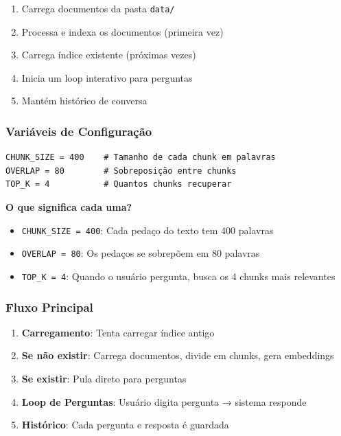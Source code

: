 \documentclass[12pt,a4paper]{article}
\begin{document}
\begin{enumerate}
    \item Carrega documentos da pasta \texttt{data/}
    \item Processa e indexa os documentos (primeira vez)
    \item Carrega índice existente (próximas vezes)
    \item Inicia um loop interativo para perguntas
    \item Mantém histórico de conversa
\end{enumerate}

\subsubsection{Variáveis de Configuração}

\begin{lstlisting}
CHUNK_SIZE = 400    # Tamanho de cada chunk em palavras
OVERLAP = 80        # Sobreposição entre chunks
TOP_K = 4           # Quantos chunks recuperar
\end{lstlisting}

\textbf{O que significa cada uma?}

\begin{itemize}
    \item \texttt{CHUNK\_SIZE = 400}: Cada pedaço do texto tem 400 palavras
    \item \texttt{OVERLAP = 80}: Os pedaços se sobrepõem em 80 palavras
    \item \texttt{TOP\_K = 4}: Quando o usuário pergunta, busca os 4 chunks mais relevantes
\end{itemize}

\subsubsection{Fluxo Principal}

\begin{enumerate}
    \item \textbf{Carregamento}: Tenta carregar índice antigo
    \item \textbf{Se não existir}: Carrega documentos, divide em chunks, gera embeddings
    \item \textbf{Se existir}: Pula direto para perguntas
    \item \textbf{Loop de Perguntas}: Usuário digita pergunta → sistema responde
    \item \textbf{Histórico}: Cada pergunta e resposta é guardada
\end{enumerate}
\end{document}
